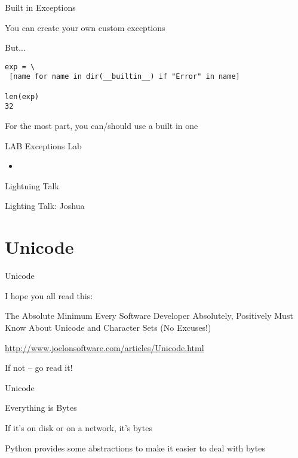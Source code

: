 \documentclass{beamer}
\begin{document}
\begin{frame}[fragile]{Built in Exceptions}

{\Large You can create your own custom exceptions}

{\Large But...}

\begin{verbatim}
exp = \
 [name for name in dir(__builtin__) if "Error" in name]

len(exp)
32
\end{verbatim}

{\Large For the most part, you can/should use a built in one}

\end{frame}



\begin{frame}{LAB}
{\Large Exceptions Lab}
\begin{itemize}
  \item
\end{itemize}

\end{frame}

\begin{frame}{Lightning Talk}

{\center

\LARGE Lighting Talk:
\vfill
Joshua
\vfill

}
\end{frame}

\section{Unicode}

\begin{frame}[fragile]{Unicode}

{\Large I hope you all read this:}

\vfill
{\Large
\centering
The Absolute Minimum Every Software Developer Absolutely,
Positively Must Know About Unicode and Character Sets (No Excuses!)

}

\vfill
\url{http://www.joelonsoftware.com/articles/Unicode.html}

\vfill
{\Large If not -- go read it!}

\end{frame}

\begin{frame}[fragile]{Unicode}

{\Large
\vfill

Everything is Bytes

\vfill
If it's on disk or on a network, it's bytes

\vfill
Python provides some abstractions to make it easier to deal with bytes

\vfill
}

\end{frame}
\end{document}
